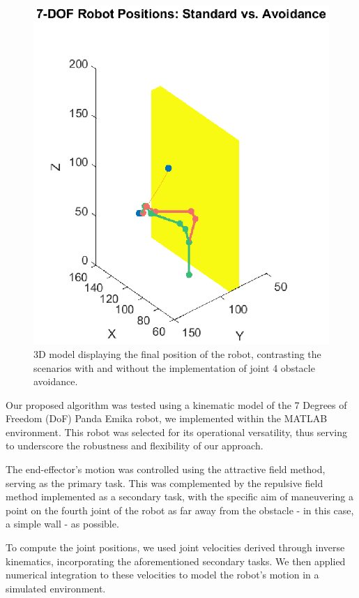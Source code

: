 \documentclass[a4paper]{article}
\begin{document}
\begin{figure}[htbp]
	\centering
	\includegraphics[width=1.0\linewidth]{7-DOF_Robot_Positions_Standard_vs_Avoidance.eps}
	\caption{3D model displaying the final position of the robot, contrasting the scenarios with and without the implementation of joint 4 obstacle avoidance.}
\end{figure}
	 	 

Our proposed algorithm was tested using a kinematic model of the 7 Degrees of Freedom (DoF) Panda Emika robot, we implemented within the MATLAB environment. This robot was selected for its operational versatility, thus serving to underscore the robustness and flexibility of our approach.

The end-effector's motion was controlled using the attractive field method, serving as the primary task. This was complemented by the repulsive field method implemented as a secondary task, with the specific aim of maneuvering a point on the fourth joint of the robot as far away from the obstacle - in this case, a simple wall - as possible.

To compute the joint positions, we used joint velocities derived through inverse kinematics, incorporating the aforementioned secondary tasks. We then applied numerical integration to these velocities to model the robot's motion in a simulated environment.
\end{document}
